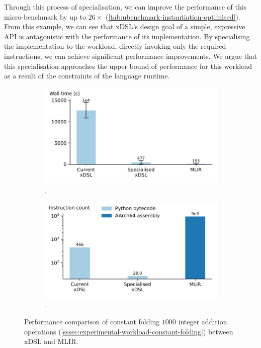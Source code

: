 Through this process of specialisation, we can improve the performance of this micro-benchmark by up to $26\times$ (\autoref{tab:ubenchmark-instantiation-optimised}).
From this example, we can see that xDSL's design goal of a simple, expressive API is antagonistic with the performance of its implementation. By specialising the implementation to the workload, directly invoking only the required instructions, we can achieve significant performance improvements. We argue that this specialisation approaches the upper bound of performance for this workload as a result of the constraints of the language runtime.


\begin{figure}[H]
    \centering
    \begin{subfigure}[b]{0.45\textwidth}
        \includegraphics[width=\textwidth]{images/specialising_optimising_xdsl_rewriting/instantiate_performance.pdf}
        \caption{.}
        \label{fig:ubenchmark-original-instantiation-performance}
    \end{subfigure}
    \hfill
    \begin{subfigure}[b]{0.45\textwidth}
        \includegraphics[width=\textwidth]{images/specialising_optimising_xdsl_rewriting/instantiate_instructions.pdf}
        \caption{.}
        \label{ubenchmark-original-instantiation-instructions}
    \end{subfigure}
    \caption{Performance comparison of constant folding $1000$ integer addition operations (\autoref{sssec:experimental-workload-constant-folding}) between xDSL and MLIR.}
    \label{ubenchmark-original-instantiation-summary}
\end{figure}
